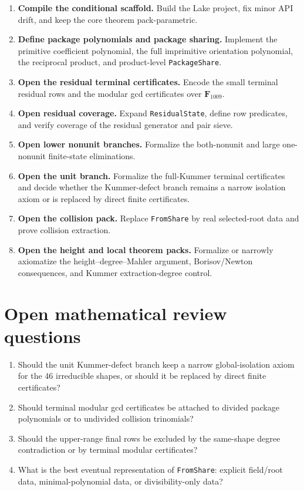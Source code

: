 \documentclass[11pt]{article}
\begin{document}
\begin{enumerate}[label=\textbf{Phase \arabic*.},leftmargin=*]
\item \textbf{Compile the conditional scaffold.}  Build the Lake project, fix
minor API drift, and keep the core theorem pack-parametric.

\item \textbf{Define package polynomials and package sharing.}  Implement the
primitive coefficient polynomial, the full imprimitive orientation polynomial,
the reciprocal product, and product-level \verb|PackageShare|.

\item \textbf{Open the residual terminal certificates.}  Encode the small
terminal residual rows and the modular gcd certificates over $\mathbf F_{1009}$.

\item \textbf{Open residual coverage.}  Expand \verb|ResidualState|, define row
predicates, and verify coverage of the residual generator and pair sieve.

\item \textbf{Open lower nonunit branches.}  Formalize the both-nonunit and
large one-nonunit finite-state eliminations.

\item \textbf{Open the unit branch.}  Formalize the full-Kummer terminal
certificates and decide whether the Kummer-defect branch remains a narrow
isolation axiom or is replaced by direct finite certificates.

\item \textbf{Open the collision pack.}  Replace \verb|FromShare| by real
selected-root data and prove collision extraction.

\item \textbf{Open the height and local theorem packs.}  Formalize or narrowly
axiomatize the height--degree--Mahler argument, Borisov/Newton consequences,
and Kummer extraction-degree control.
\end{enumerate}

\section{Open mathematical review questions}

\begin{enumerate}[label=(\arabic*)]
\item Should the unit Kummer-defect branch keep a narrow global-isolation axiom
for the 46 irreducible shapes, or should it be replaced by direct finite
certificates?
\item Should terminal modular gcd certificates be attached to divided package
polynomials or to undivided collision trinomials?
\item Should the upper-range final rows be excluded by the same-shape degree
contradiction or by terminal modular certificates?
\item What is the best eventual representation of \verb|FromShare|: explicit
field/root data, minimal-polynomial data, or divisibility-only data?
\end{enumerate}
\end{document}
